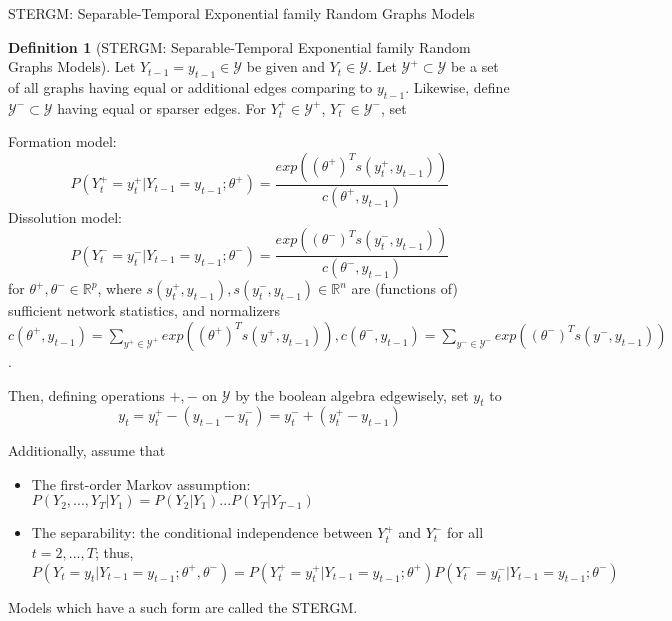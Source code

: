 \documentclass[aspectratio=169,ignorenonframetext,9pt]{beamer}
\theoremstyle{plain}
\theoremstyle{definition}
\newtheorem{defn}{Definition}[section]
\begin{document}
\begin{frame}{STERGM: Separable-Temporal Exponential family Random Graphs Models}
    \begin{defn}[STERGM: Separable-Temporal Exponential family Random Graphs Models]
        Let $Y_{t-1}=y_{t-1} \in \mathcal{Y}$ be given and $Y_t \in \mathcal{Y}$.
        Let $\mathcal{Y}^+ \subset \mathcal{Y}$ be a set of all graphs having equal or additional edges comparing to $y_{t-1}$. Likewise, define $\mathcal{Y}^-\subset\mathcal{Y}$ having equal or sparser edges.
        For $Y_t^+ \in \mathcal{Y}^+$, $Y_t^- \in \mathcal{Y}^-$, set 
        
        Formation model:
        \[P(Y_t^+=y_t^+|Y_{t-1}=y_{t-1};\theta^+) = \frac{exp((\theta^+)^{T}s(y_t^+, y_{t-1}))}{c(\theta^+, y_{t-1})}\]
        Dissolution model:
        \[P(Y_t^-=y_t^-|Y_{t-1}=y_{t-1};\theta^-) = \frac{exp((\theta^-)^{T}s(y_t^-, y_{t-1}))}{c(\theta^-, y_{t-1})}\]
        for $\theta^+,\theta^-\in\mathbb{R}^p$, where $s(y_t^+, y_{t-1}), s(y_t^-, y_{t-1})\in\mathbb{R}^n$ are (functions of) sufficient network statistics,
        and normalizers $c(\theta^+, y_{t-1})=\sum_{y^+\in\mathcal{Y}^+}exp((\theta^+)^{T}s(y^+, y_{t-1})), c(\theta^-, y_{t-1})=\sum_{y^-\in\mathcal{Y}^-}exp((\theta^-)^{T}s(y^-, y_{t-1}))$.
        
        Then, defining operations $+,-$ on $\mathcal{Y}$ by the boolean algebra edgewisely, set $y_t$ to
        \[y_t=y_t^+ - (y_{t-1} - y_t^-) = y_t^- + (y_t^+ - y_{t-1})\]
        
        Additionally, assume that
        \begin{itemize}
            \item The first-order Markov assumption: $P(Y_2,...,Y_T|Y_1)=P(Y_2|Y_1)...P(Y_T|Y_{T-1})$
            \item The separability: the conditional independence between $Y_t^+$ and $Y_t^-$ for all $t=2,...,T$;
                thus, \(P(Y_t=y_t|Y_{t-1}=y_{t-1};\theta^+,\theta^-)=P(Y_t^+=y_t^+|Y_{t-1}=y_{t-1};\theta^+)P(Y_t^-=y_t^-|Y_{t-1}=y_{t-1};\theta^-)\)
        \end{itemize}
        Models which have a such form are called the STERGM.
    \end{defn}
\end{frame}
\end{document}
